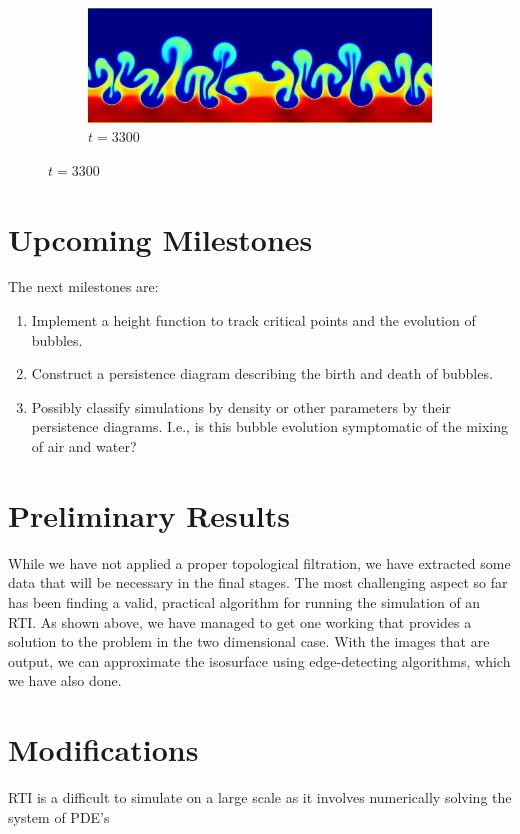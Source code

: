 \documentclass[12pt, fullpage,letterpaper]{article}
\begin{document}
\begin{figure}[ht!]
\begin{subfigure}
			\caption{$t = 2900$}
		\end{subfigure}
		\begin{subfigure}
			\centering
			\includegraphics[scale = .25]{fig4.png}
			\caption{$t = 3300$}
		\end{subfigure}
	\end{figure}
	
	
	\section*{\normalfont Upcoming Milestones} The next milestones are:
	\begin{enumerate}
		\item Implement a height function to track critical points and the evolution of bubbles.
		\item Construct a persistence diagram describing the birth and death of bubbles.
		\item Possibly classify simulations by density or other parameters by their persistence diagrams. I.e., is this bubble evolution symptomatic of the mixing of air and water?
	\end{enumerate} 

	\section*{\normalfont Preliminary Results}
	While we have not applied a proper topological filtration, we have extracted some data that will be necessary in the final stages. The most challenging aspect so far has been finding a valid, practical algorithm for running the simulation of an RTI. As shown above, we have managed to get one working that provides a solution to the problem in the two dimensional case. With the images that are output, we can approximate the isosurface using edge-detecting algorithms, which we have also done.
	
	\section*{\normalfont Modifications} RTI is a difficult to simulate on a large scale as it involves numerically solving the system of PDE's
	
\end{document}
